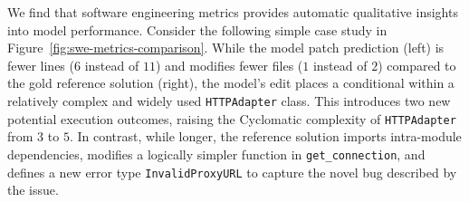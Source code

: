 We find that software engineering metrics provides automatic qualitative insights into model performance.
Consider the following simple case study in Figure~\ref{fig:swe-metrics-comparison}.
While the model patch prediction (left) is fewer lines ($6$ instead of $11$) and modifies fewer files ($1$ instead of $2$) compared to the gold reference solution (right), the model's edit places a conditional within a relatively complex and widely used \texttt{HTTPAdapter} class.
This introduces two new potential execution outcomes, raising the Cyclomatic complexity of \texttt{HTTPAdapter} from $3$ to $5$.
In contrast, while longer, the reference solution imports intra-module dependencies, modifies a logically simpler function in \texttt{get\_connection}, and defines a new error type \texttt{InvalidProxyURL} to capture the novel bug described by the issue.
